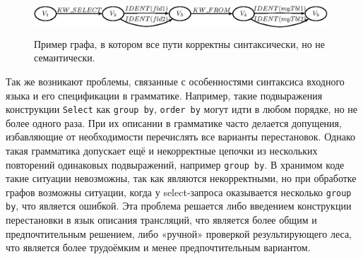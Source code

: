 \documentclass[a5paper]{article}
\begin{document}
\begin{figure}
    \begin{center}
        \includegraphics[width=11cm,height=1.3cm]{graphs/semantics_example.eps}
        \caption{ Пример графа, в котором все пути корректны синтаксически, но не семантически.}
        \label{pic7}
    \end{center}
\end{figure}

Так же возникают проблемы, связанные с особенностями синтаксиса входного языка и его спецификации в грамматике. Например, такие подвыражения конструкции \verb|Select| как \verb|group by|, \verb|order by| могут идти в любом порядке, но не более одного раза. При их описании в грамматике часто делается допущения, избавляющие от необходимости перечислять все варианты перестановок. Однако такая грамматика допускает ещё и некорректные цепочки из нескольких повторений одинаковых подвыражений, например \verb|group by|. В хранимом коде такие ситуации невозможны, так как являются некорректными, но при обработке  графов возможны ситуации, когда у select-запроса оказывается несколько \verb|group by|, что является ошибкой. Эта проблема решается либо введением конструкции перестановки в язык описания трансляций, что является более общим и предпочтительным решением, либо «ручной» проверкой результирующего леса, что является более трудоёмким и менее предпочтительным вариантом.
\end{document}
